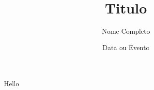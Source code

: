 \documentclass{beamer}
\title{Titulo}
\date[Data ou Evento Curto]{Data ou Evento}
\author[Nome Curto]{Nome Completo} %
\begin{document}
\begin{frame}
    \titlepage
\end{frame}

\begin{frame}
    Hello
\end{frame}
\end{document}
